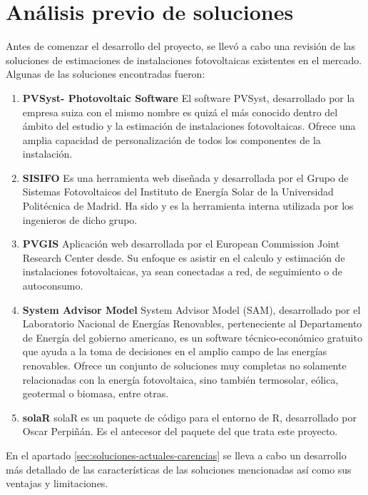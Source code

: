 \section{Análisis previo de soluciones}
\label{sec:org6caccd2}
Antes de comenzar el desarrollo del proyecto, se llevó a cabo una revisión de las soluciones de estimaciones de instalaciones fotovoltaicas existentes en el mercado. Algunas de las soluciones encontradas fueron:
\begin{enumerate}
\item \textbf{PVSyst- Photovoltaic Software}
El software PVSyst, desarrollado por la empresa suiza con el mismo nombre es quizá el más conocido dentro del ámbito del estudio y la estimación de instalaciones fotovoltaicas. Ofrece una amplia capacidad de personalización de todos los componentes de la instalación.
\item \textbf{SISIFO}
Es una herramienta web diseñada y desarrollada por el Grupo de Sistemas Fotovoltaicos del Instituto de Energía Solar de la Universidad Politécnica de Madrid. Ha sido y es la herramienta interna utilizada por los ingenieros de dicho grupo.
\item \textbf{PVGIS}
Aplicación web desarrollada por el European Commission Joint Research Center desde. Su enfoque es asistir en el calculo y estimación de instalaciones fotovoltaicas, ya sean conectadas a red, de seguimiento o de autoconsumo.
\item \textbf{System Advisor Model}
System Advisor Model (SAM), desarrollado por el Laboratorio Nacional de Energías Renovables, perteneciente al Departamento de Energía del gobierno americano, es un software técnico-económico gratuito que ayuda a la toma de decisiones en el amplio campo de las energías renovables. Ofrece un conjunto de soluciones muy completas no solamente relacionadas con la energía fotovoltaica, sino también termosolar, eólica, geotermal o biomasa, entre otras.
\item \textbf{solaR}
solaR es un paquete de código para el entorno de R, desarrollado por Oscar Perpiñán. Es el antecesor del paquete del que trata este proyecto.
\end{enumerate}

En el apartado \ref{sec:soluciones-actuales-carencias} se lleva a cabo un desarrollo más detallado de las características de las soluciones mencionadas así como sus ventajas y limitaciones.
